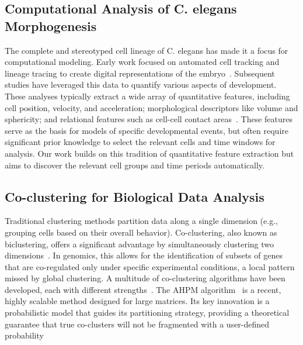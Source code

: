 \documentclass[unnumsec,webpdf,contemporary,large,namedate]{oup-authoring-template}%
\theoremstyle{thmstyleone}%
\theoremstyle{thmstyletwo}%
\theoremstyle{thmstylethree}%
\begin{document}
\subsection{Computational Analysis of C. elegans Morphogenesis}
The complete and stereotyped cell lineage of C. elegans has made it a focus for computational modeling. Early work focused on automated cell tracking and lineage tracing to create digital representations of the embryo~\citep{bao2006AutomatedCellLineage,murray2008AutomatedAnalysisEmbryonic}. Subsequent studies have leveraged this data to quantify various aspects of development. These analyses typically extract a wide array of quantitative features, including cell position, velocity, and acceleration; morphological descriptors like volume and sphericity; and relational features such as cell-cell contact areas~\citep{2023FastAccurateCell}.
These features serve as the basis for models of specific developmental events, but often require significant prior knowledge to select the relevant cells and time windows for analysis. Our work builds on this tradition of quantitative feature extraction but aims to discover the relevant cell groups and time periods automatically.

\subsection{Co-clustering for Biological Data Analysis}
Traditional clustering methods partition data along a single dimension (e.g., grouping cells based on their overall behavior). Co-clustering, also known as biclustering, offers a significant advantage by simultaneously clustering two dimensions~\citep{hochreiter2010FABIAFactorAnalysis,sill2011RobustBiclusteringSparse,orzechowski2018EBICEvolutionarybasedParallel,yi2021COBRACFastImplementation,kim2007SparseNonnegativeMatrix}. In genomics, this allows for the identification of subsets of genes that are co-regulated only under specific experimental conditions, a local pattern missed by global clustering. A multitude of co-clustering algorithms have been developed, each with different strengths~\citep{saelens2018ComprehensiveEvaluationModule}. The AHPM algorithm~\citep{wu2024ScalableCoclusteringLargescale} is a recent, highly scalable method designed for large matrices. Its key innovation is a probabilistic model that guides its partitioning strategy, providing a theoretical guarantee that true co-clusters will not be fragmented with a user-defined probability
\end{document}
